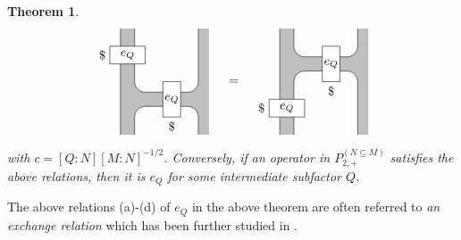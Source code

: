\documentclass[11pt,letterpaper]{amsart}
\newtheorem{theorem}{Theorem}[section]
\theoremstyle{definition}
\theoremstyle{remark}
\begin{document}
\begin{theorem}
\begin{align*}
\begin{tikzpicture}
\path [fill=lightgray] (.3,1)--(.3,-2)--(.7,-2)--(.7,-1.5) arc[radius=.3,start angle=180, end angle=90]--(2.2,-1.2) arc[radius=.3,start angle=90, end angle=0]--(2.5,-2)--(2.8,-2)--(2.8,1)--(2.5,1)--(2.5,-.5) arc[radius=.3,start angle=0,end angle=-90]--(1,-.8) arc[radius=.3,start angle=270,end angle=180]--(.7,1);
\draw (.3,1)--(.3,-2);
\draw (.7,1)--(.7,-.5);
\draw (.7,-.5) arc [radius=.3,start angle=180, end angle=270];
\draw (1,-.8)--(2.2,-.8);
\draw (2.2,-.8) arc[radius=.3,start angle=270, end angle=360];
\draw (2.5,-.5)--(2.5,1);
\draw (2.2,-1.2) arc[radius=.3,start angle=90, end angle=0];
\draw (2.2,-1.2)--(1,-1.2);
\draw (1,-1.2) arc[radius=.3,start angle=90,end angle=180];
\draw (.7,-1.5)--(.7,-2);
\draw (2.5,-1.5)--(2.5,-2);
\draw [fill=white] (0,0) rectangle (1,.5);
\draw [fill=white] (1.5,-.5) rectangle (2,-1.5);
\node at (0,.25)[left] {$\$$};
\node at (1.75,-1.5)[below] {$\$$};
\node at (.5,.25) {$e_Q$};
\node at (1.75,-1){$e_Q$};
\node at (3.5,-.5){$=$};
\path [fill=lightgray] (4.8,1)--(4.8,-2)--(5.2,-2)--(5.2,-.5) arc[radius=.3,start angle=180,end angle=90]--(6.7,-.2) arc[radius=.3,start angle=90,end angle=0]--(7,-2)--(7.3,-2)--(7.3,1)--(7,1)--(7,.5) arc[radius=.3,start angle=0, end angle=-90]--(5.5,.2) arc[radius=.3,start angle=270,end angle=180]--(5.2,1);
\draw (4.8,-2)--(4.8,1);
\draw (5.2,-2)--(5.2,-.5);
\draw (5.2,-.5) arc[radius=.3, start angle=180, end angle=90];
\draw (5.5,-.2)--(6.7,-.2);
\draw (6.7,-.2) arc[radius=.3,start angle=90, end angle=0];
\draw (7,-.5)--(7,-2);
\draw (7,1)--(7,.5);
\draw (7,.5) arc[radius=.3,start angle=0, end angle=-90];
\draw (6.7,.2)--(5.5,.2);
\draw (5.5,.2) arc[radius=.3,start angle=270, end angle=180];
\draw (5.2,.5)--(5.2,1);
\draw [fill=white] (4.5,-1.5) rectangle (5.5,-1);
\draw [fill=white] (6,.5) rectangle (6.5,-.5);
\node at (4.5,-1.25) [left] {$\$$};
\node at (6.25,-.5)[below] {$\$$};
\node at (5,-1.25) {$e_Q$};
\node at (6.25,0){$e_Q$};
\end{tikzpicture}
\end{align*}
with $c = [Q:N ][M:N]^{-1/2}$. 
Conversely, if an operator in $P^{(N\subseteq M)}_{2,+}$ satisfies the above relations, then it is $e_Q$ for some intermediate subfactor $Q$.
  \end{theorem}
 

The above relations (a)-(d) of $e_Q$ in the above theorem are often referred to {\it an exchange relation} which has been further studied in \cite{La,BiJo2,Liu}.
\end{document}
